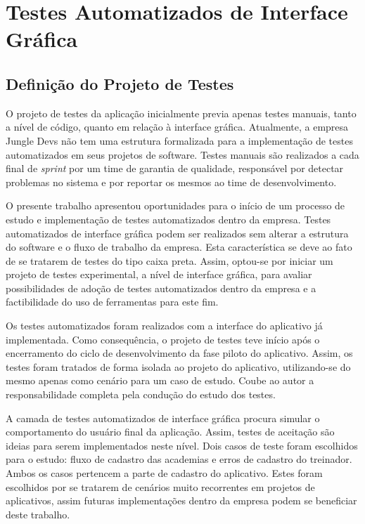 \chapter{Testes Automatizados de Interface Gráfica} \label{cap:tests}

\section{Definição do Projeto de Testes}
O projeto de testes da aplicação inicialmente previa apenas testes manuais, tanto a nível de código, quanto em relação à interface gráfica. Atualmente, a empresa Jungle Devs não tem uma estrutura formalizada para a implementação de testes automatizados em seus projetos de software. Testes manuais são realizados a cada final de \textit{sprint} por um time de garantia de qualidade, responsável por detectar problemas no sistema e por reportar os mesmos ao time de desenvolvimento.

O presente trabalho apresentou oportunidades para o início de um processo de estudo e implementação de testes automatizados dentro da empresa. Testes automatizados de interface gráfica podem ser realizados sem alterar a estrutura do software e o fluxo de trabalho da empresa. Esta característica se deve ao fato de se tratarem de testes do tipo caixa preta. Assim, optou-se por iniciar um projeto de testes experimental, a nível de interface gráfica, para avaliar possibilidades de adoção de testes automatizados dentro da empresa e a factibilidade do uso de ferramentas para este fim.

Os testes automatizados foram realizados com a interface do aplicativo já implementada. Como consequência, o projeto de testes teve início após o encerramento do ciclo de desenvolvimento da fase piloto do aplicativo. Assim, os testes foram tratados de forma isolada ao projeto do aplicativo, utilizando-se do mesmo apenas como cenário para um caso de estudo. Coube ao autor a responsabilidade completa pela condução do estudo dos testes.

A camada de testes automatizados de interface gráfica procura simular o comportamento do usuário final da aplicação. Assim, testes de aceitação são ideias para serem implementados neste nível. Dois casos de teste foram escolhidos para o estudo: fluxo de cadastro das academias e erros de cadastro do treinador. Ambos os casos pertencem a parte de cadastro do aplicativo. Estes foram escolhidos por se tratarem de cenários muito recorrentes em projetos de aplicativos, assim futuras implementações dentro da empresa podem se beneficiar deste trabalho.


